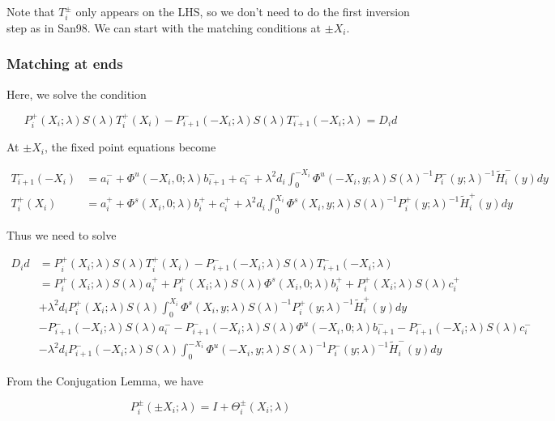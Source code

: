\documentclass[12pt]{article}
\begin{document}
Note that $T_i^\pm$ only appears on the LHS, so we don't need to do the first inversion step as in San98. We can start with the matching conditions at $\pm X_i$.

\subsubsection*{Matching at ends}

Here, we solve the condition

\[
P_i^+(X_i; \lambda) S(\lambda) T_i^+(X_i) - P_{i+1}^-(-X_i; \lambda) S(\lambda) T_{i+1}^-(-X_i; \lambda) = D_i d
\]

At $\pm X_i$, the fixed point equations become

\begin{align*}
T_{i+1}^-(-X_i) &= a_i^- + \Phi^u(-X_i, 0; \lambda) b_{i+1}^- + c_i^- 
+ \lambda^2 d_i \int_0^{-X_i} \Phi^u(-X_i, y; \lambda) S(\lambda)^{-1} P_i^-(y; \lambda)^{-1} \tilde{H}_i^-(y) dy \\ 
T_i^+(X_i) &= a_i^+ + \Phi^s(X_i, 0; \lambda) b_i^+ + c_i^+ 
+ \lambda^2 d_i \int_0^{X_i} \Phi^s(X_i, y; \lambda) S(\lambda)^{-1} P_i^+(y; \lambda)^{-1} \tilde{H}_i^+(y) dy
\end{align*}

Thus we need to solve

\begin{align*}
D_i d &= P_i^+(X_i; \lambda) S(\lambda) T_i^+(X_i) - P_{i+1}^-(-X_i; \lambda) S(\lambda) T_{i+1}^-(-X_i; \lambda) \\
&= P_i^+(X_i; \lambda) S(\lambda) a_i^+ + P_i^+(X_i; \lambda) S(\lambda) \Phi^s(X_i, 0; \lambda) b_i^+ + P_i^+(X_i; \lambda) S(\lambda) c_i^+ \\
&+ \lambda^2 d_i P_i^+(X_i; \lambda) S(\lambda) \int_0^{X_i} \Phi^s(X_i, y; \lambda) S(\lambda)^{-1} P_i^+(y; \lambda)^{-1} \tilde{H}_i^+(y) dy \\
&- P_{i+1}^-(-X_i; \lambda)S(\lambda) a_i^- - P_{i+1}^-(-X_i; \lambda) S(\lambda)\Phi^u(-X_i, 0; \lambda) b_{i+1}^- - P_{i+1}^-(-X_i; \lambda)S(\lambda) c_i^- \\
&- \lambda^2 d_i P_{i+1}^-(-X_i; \lambda) S(\lambda) \int_0^{-X_i} \Phi^u(-X_i, y; \lambda) S(\lambda)^{-1} P_i^-(y; \lambda)^{-1} \tilde{H}_i^-(y) dy 
\end{align*}

From the Conjugation Lemma, we have

\begin{equation}\label{conjest}
P_i^\pm(\pm X_i; \lambda) = I + \Theta_i^\pm(X_i; \lambda)
\end{equation}
\end{document}
